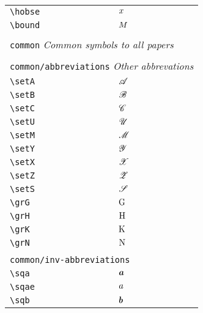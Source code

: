 \begin{longtable}{lll}
 {\color[rgb]{0.5,0.5,0.5}\texttt{\textbackslash hobse}} & $x$ & \\ 
 {\color[rgb]{0.5,0.5,0.5}\texttt{\textbackslash bound}} & $M$ & \\ 
  &  & \\ 
 \multicolumn{3}{l}{{\color[rgb]{0.5,0.5,0.5}\texttt{common}} \emph{Common symbols to all papers}}\\ 
 \hline
\hline
 &  & \\ 
 \multicolumn{3}{l}{{\color[rgb]{0.5,0.5,0.5}\texttt{common/abbreviations}} \emph{Other abbrevations}}\\ 
 \hline
{\color[rgb]{0.5,0.5,0.5}\texttt{\textbackslash setA}} & $\mathscr{A}$ & \\ 
 {\color[rgb]{0.5,0.5,0.5}\texttt{\textbackslash setB}} & $\mathscr{B}$ & \\ 
 {\color[rgb]{0.5,0.5,0.5}\texttt{\textbackslash setC}} & $\mathscr{C}$ & \\ 
 {\color[rgb]{0.5,0.5,0.5}\texttt{\textbackslash setU}} & $\mathscr{U}$ & \\ 
 {\color[rgb]{0.5,0.5,0.5}\texttt{\textbackslash setM}} & $\mathscr{M}$ & \\ 
 {\color[rgb]{0.5,0.5,0.5}\texttt{\textbackslash setY}} & $\mathscr{Y}$ & \\ 
 {\color[rgb]{0.5,0.5,0.5}\texttt{\textbackslash setX}} & $\mathscr{X}$ & \\ 
 {\color[rgb]{0.5,0.5,0.5}\texttt{\textbackslash setZ}} & $\mathscr{Z}$ & \\ 
 {\color[rgb]{0.5,0.5,0.5}\texttt{\textbackslash setS}} & $\mathscr{S}$ & \\ 
 {\color[rgb]{0.5,0.5,0.5}\texttt{\textbackslash grG}} & $\mathrm{G}$ & \\ 
 {\color[rgb]{0.5,0.5,0.5}\texttt{\textbackslash grH}} & $\mathrm{H}$ & \\ 
 {\color[rgb]{0.5,0.5,0.5}\texttt{\textbackslash grK}} & $\mathrm{K}$ & \\ 
 {\color[rgb]{0.5,0.5,0.5}\texttt{\textbackslash grN}} & $\mathrm{N}$ & \\ 
  &  & \\ 
 \multicolumn{3}{l}{{\color[rgb]{0.5,0.5,0.5}\texttt{common/inv-abbreviations}} \emph{}}\\ 
 \hline
{\color[rgb]{0.5,0.5,0.5}\texttt{\textbackslash sqa}} & $\boldsymbol{a}$ & \\ 
 {\color[rgb]{0.5,0.5,0.5}\texttt{\textbackslash sqae}} & $a$ & \\ 
 {\color[rgb]{0.5,0.5,0.5}\texttt{\textbackslash sqb}} & $\boldsymbol{b}$ & \\ 

\end{longtable}
